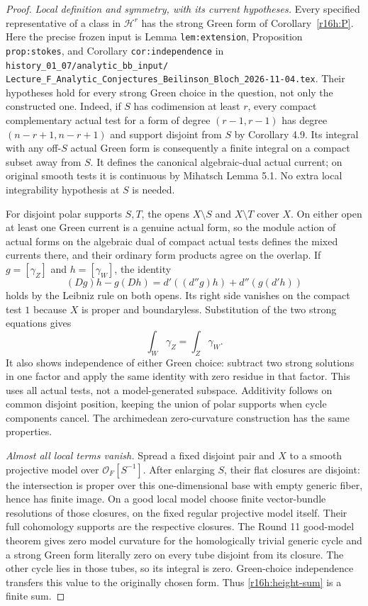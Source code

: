 \begin{proof}
\emph{Local definition and symmetry, with its current hypotheses.}
Every specified representative of a class in $\mathcal H^r$ has the
strong Green form of Corollary~\ref{r16h:P}. Here the precise frozen
input is Lemma \texttt{lem:extension}, Proposition
\texttt{prop:stokes}, and Corollary \texttt{cor:independence} in
\texttt{history\_01\_07/analytic\_bb\_input/}\allowbreak
\texttt{Lecture\_F\_Analytic\_Conjectures\_Beilinson\_Bloch\_2026-11-04.tex}.
Their hypotheses hold for every strong Green choice in the question,
not only the constructed one. Indeed, if $S$ has codimension at least
$r$, every compact complementary actual test for a form of degree
$(r-1,r-1)$ has degree $(n-r+1,n-r+1)$ and support disjoint from
$S$ by Corollary 4.9. Its integral with any off-$S$ actual Green
form is consequently a finite integral on a compact subset away
from $S$. It defines the canonical algebraic-dual actual current;
on original smooth tests it is continuous by Mihatsch Lemma 5.1.
No extra local integrability hypothesis at $S$ is needed.

For disjoint polar supports $S,T$, the opens $X\setminus S$ and
$X\setminus T$ cover $X$. On either open at least one Green current
is a genuine actual form, so the module action of actual forms on
the algebraic dual of compact actual tests defines the mixed
currents there, and their ordinary form products agree on the overlap.
If $g=[\gamma_Z]$ and $h=[\gamma_W]$, the identity
\[
 (Dg)h-g(Dh)=d'((d''g)h)+d''(g(d'h))
\]
holds by the Leibniz rule on both opens. Its right side vanishes
on the compact test $1$ because $X$ is proper and boundaryless.
Substitution of the two strong equations gives
\[
                    \int_W\gamma_Z=\int_Z\gamma_W.
\]
It also shows independence of either Green choice: subtract two
strong solutions in one factor and apply the same identity with
zero residue in that factor. This uses all actual tests, not a
model-generated subspace. Additivity follows on common disjoint
position, keeping the union of polar supports when cycle components
cancel. The archimedean zero-curvature construction has the same
properties.

\emph{Almost all local terms vanish.}
Spread a fixed disjoint pair and $X$ to a smooth projective model
over $\mathcal O_F[S^{-1}]$. After enlarging $S$, their flat closures
are disjoint: the intersection is proper over this one-dimensional
base with empty generic fiber, hence has finite image. On a good
local model choose finite vector-bundle resolutions of those
closures, on the fixed regular projective model itself. Their full
cohomology supports are the respective closures. The Round 11
good-model theorem gives zero model curvature for the homologically
trivial generic cycle and a strong Green form literally zero on
every tube disjoint from its closure. The other cycle lies in those
tubes, so its integral is zero. Green-choice independence transfers
this value to the originally chosen form. Thus
\eqref{r16h:height-sum} is a finite sum.


\end{proof}
